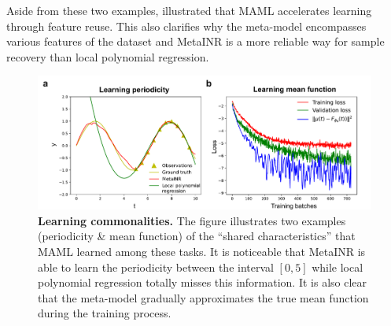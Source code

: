 \documentclass{article}
\begin{document}
{Aside from these two examples, \cite{raghu2019rapid}  illustrated that MAML accelerates learning through feature reuse.}
This also clarifies why the meta-model encompasses various features of the dataset and MetaINR is a more reliable way for sample recovery than local polynomial regression. 
\begin{figure}[htb]
  \centering
  \includegraphics[width=\textwidth]{learning_commonalities.pdf}
  \caption{\textbf{Learning commonalities.} The figure illustrates two examples (periodicity \& mean function) of the ``shared characteristics'' that MAML learned among these tasks. 
  It is noticeable that MetaINR is able to learn the periodicity between the interval $[0,5]$ while local polynomial regression totally misses this information. It is also clear that the meta-model gradually approximates the true mean function during the training process. }
  \label{Learning commonalities}
\end{figure}



\end{document}
